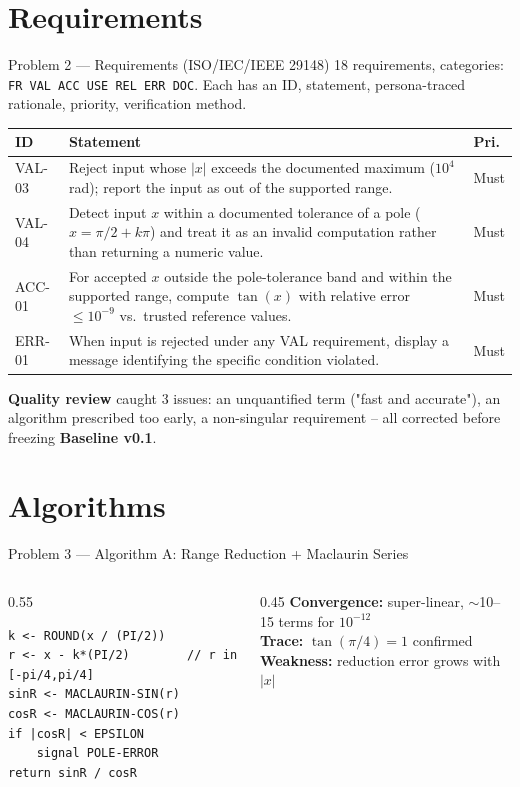 \documentclass[10pt]{beamer}
\begin{document}
\section{Requirements}
\begin{frame}{Problem 2 --- Requirements (ISO/IEC/IEEE 29148)}
  18 requirements, categories: \texttt{FR VAL ACC USE REL ERR DOC}. Each has an ID, statement, persona-traced rationale, priority, verification method.
  \begin{table}
    \footnotesize
    \begin{tabular}{@{}p{1.3cm}p{7.7cm}p{1cm}@{}}
      \toprule
      ID & Statement & Pri. \\
      \midrule
      VAL-03 & Reject input whose $|x|$ exceeds the documented maximum ($10^4$ rad); report the input as out of the supported range. & Must \\
      VAL-04 & Detect input $x$ within a documented tolerance of a pole ($x = \pi/2 + k\pi$) and treat it as an invalid computation rather than returning a numeric value. & Must \\
      ACC-01 & For accepted $x$ outside the pole-tolerance band and within the supported range, compute $\tan(x)$ with relative error $\le 10^{-9}$ vs.\ trusted reference values. & Must \\
      ERR-01 & When input is rejected under any VAL requirement, display a message identifying the specific condition violated. & Must \\
      \bottomrule
    \end{tabular}
  \end{table}
  \textbf{Quality review} caught 3 issues: an unquantified term ("fast and accurate"), an algorithm prescribed too early, a non-singular requirement -- all corrected before freezing \textbf{Baseline v0.1}.
\end{frame}

\section{Algorithms}
\begin{frame}[fragile]{Problem 3 --- Algorithm A: Range Reduction + Maclaurin Series}
  \begin{columns}
    \begin{column}{0.55\textwidth}
      \begin{lstlisting}[style=pseudo]
k <- ROUND(x / (PI/2))
r <- x - k*(PI/2)        // r in [-pi/4,pi/4]
sinR <- MACLAURIN-SIN(r)
cosR <- MACLAURIN-COS(r)
if |cosR| < EPSILON
    signal POLE-ERROR
return sinR / cosR
      \end{lstlisting}
    \end{column}
    \begin{column}{0.45\textwidth}
      \textbf{Convergence:} super-linear, $\sim$10--15 terms for $10^{-12}$ \\[0.2cm]
      \textbf{Trace:} $\tan(\pi/4)=1$ confirmed \\[0.2cm]
      \textbf{Weakness:} reduction error grows with $|x|$
    \end{column}
  \end{columns}
\end{frame}
\end{document}

